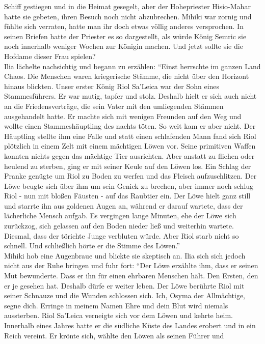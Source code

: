 Schiff gestiegen und in die Heimat gesegelt, aber der Hohepriester Hisio-Mahar hatte sie gebeten, 
ihren Besuch noch nicht abzubrechen. Mihiki war zornig und fühlte sich verraten, hatte man ihr doch 
etwas völlig anderes versprochen. In seinen Briefen hatte der Priester es so dargestellt, als würde 
König Semric sie noch innerhalb weniger Wochen zur Königin machen. Und jetzt sollte sie die Hofdame 
dieser Frau spielen?\\
Ilia lächelte nachsichtig und begann zu erzählen: ``Einst herrschte im ganzen Land Chaos. Die 
Menschen waren kriegerische Stämme, die nicht über den Horizont hinaus blickten. Unser erster König 
Riol Sa'Leica war der Sohn eines Stammesführers. Er war mutig, tapfer und stolz. Deshalb hielt er 
sich auch nicht an die Friedensverträge, die sein Vater mit den umliegenden Stämmen ausgehandelt 
hatte. Er machte sich mit wenigen Freunden auf den Weg und wollte einen Stammeshäuptling des nachts 
töten. So weit kam er aber nicht. Der Häuptling stellte ihm eine Falle und statt einen schlafenden 
Mann fand sich Riol plötzlich in einem Zelt mit einem mächtigen Löwen vor. Seine primitiven Waffen 
konnten nichts gegen das mächtige Tier ausrichten. Aber anstatt zu fliehen oder heulend zu sterben, 
ging er mit seiner Keule auf den Löwen los. Ein Schlag der Pranke genügte um Riol zu Boden zu 
werfen und das Fleisch aufzuschlitzen. Der Löwe beugte sich über ihm um sein Genick zu brechen, 
aber immer noch schlug Riol - nun mit bloßen Fäusten - auf das Raubtier ein. Der Löwe hielt ganz 
still und starrte ihn aus goldenen Augen an, während er darauf wartete, dass der lächerliche Mensch 
aufgab. Es vergingen lange Minuten, ehe der Löwe sich zurückzog, sich gelassen auf den Boden nieder 
ließ und weiterhin wartete. Diesmal, dass der törichte Junge verbluten würde. Aber Riol starb nicht 
so schnell. Und schließlich hörte er die Stimme des Löwen.''\\
Mihiki hob eine Augenbraue und blickte sie skeptisch an. Ilia sich sich jedoch nicht aus der Ruhe 
bringen und fuhr fort: ``Der Löwe erzählte ihm, dass er seinen Mut bewunderte. Dass er ihn für 
einen ehrbaren Menschen hält. Den Ersten, den er je gesehen hat. Deshalb dürfe er weiter leben. Der 
Löwe berührte Riol mit seiner Schnauze und die Wunden schlossen sich. Ich, Osyma der Allmächtige, 
segne dich. Erringe in meinem Namen Ehre und dein Blut wird niemals aussterben. Riol Sa'Leica 
verneigte sich vor dem Löwen und kehrte heim. Innerhalb eines Jahres hatte er die südliche Küste 
des Landes erobert und in ein Reich vereint. Er krönte sich, wählte den Löwen als seinen Führer und 
